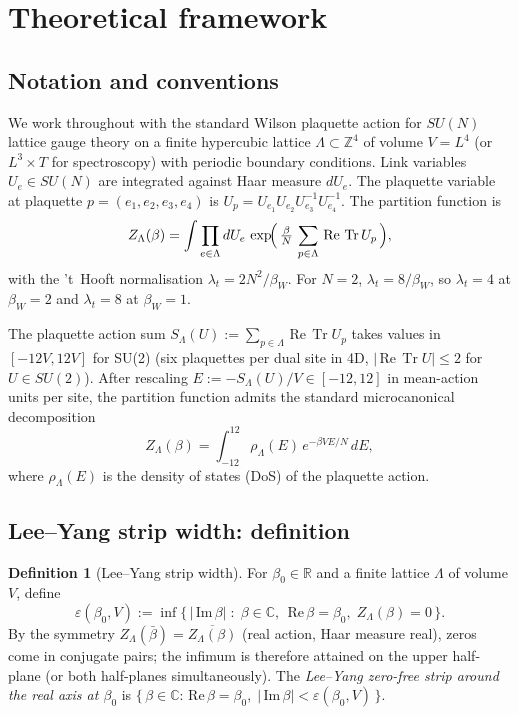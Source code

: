 \documentclass[11pt,a4paper]{article}
\theoremstyle{definition}
\newtheorem{definition}[theorem]{Definition}
\theoremstyle{remark}
\DeclareMathOperator{\Tr}{Tr}
\newcommand{\Z}{\mathbb{Z}}
\newcommand{\R}{\mathbb{R}}
\newcommand{\C}{\mathbb{C}}
\newcommand{\sgnIm}{\,\mathrm{Im}\,}
\newcommand{\sgnRe}{\,\mathrm{Re}\,}
\begin{document}
\medskip

\section{Theoretical framework}\label{sec:framework}

\subsection{Notation and conventions}\label{sec:conv}

We work throughout with the standard Wilson plaquette action for
$SU(N)$ lattice gauge theory on a finite hypercubic lattice
$\Lambda \subset \Z^4$ of volume $V = L^4$ (or $L^3 \times T$ for
spectroscopy) with periodic boundary conditions. Link variables
$U_e \in SU(N)$ are integrated against Haar measure $dU_e$. The
plaquette variable at plaquette $p = (e_1, e_2, e_3, e_4)$ is
$U_p = U_{e_1} U_{e_2} U_{e_3}^{-1} U_{e_4}^{-1}$. The partition
function is
\begin{equation}
Z_\Lambda(\beta) = \int \prod_{e \in \Lambda} dU_e
\,\exp\!\Bigl(\,\tfrac{\beta}{N}\,\sum_{p \in \Lambda}
\sgnRe \Tr U_p\,\Bigr),
\label{eq:Z}
\end{equation}
with the 't~Hooft normalisation $\lambda_t = 2N^2/\beta_W$. For
$N=2$, $\lambda_t = 8/\beta_W$, so $\lambda_t = 4$ at
$\beta_W = 2$ and $\lambda_t = 8$ at $\beta_W = 1$.

The plaquette action sum
$S_\Lambda(U) := \sum_{p \in \Lambda} \sgnRe \Tr U_p$
takes values in $[-12V, 12V]$ for SU(2) (six plaquettes per dual
site in 4D, $|\sgnRe \Tr U| \le 2$ for $U \in SU(2)$).
After rescaling $E := -S_\Lambda(U)/V \in [-12, 12]$ in mean-action
units per site, the partition function admits the standard
microcanonical decomposition
\begin{equation}
Z_\Lambda(\beta) = \int_{-12}^{12} \rho_\Lambda(E)\,
e^{-\beta V E / N}\, dE,
\label{eq:Zdos}
\end{equation}
where $\rho_\Lambda(E)$ is the density of states (DoS) of the
plaquette action.

\subsection{Lee--Yang strip width: definition}

\begin{definition}[Lee--Yang strip width]\label{def:strip}
For $\beta_0 \in \R$ and a finite lattice $\Lambda$ of volume
$V$, define
\begin{equation}
\varepsilon(\beta_0, V)
:= \inf\bigl\{\,|\sgnIm \beta| \;:\; \beta \in \C,\;
\sgnRe \beta = \beta_0,\;
Z_\Lambda(\beta) = 0\,\bigr\}.
\label{eq:stripdef}
\end{equation}
By the symmetry $Z_\Lambda(\bar\beta) = \overline{Z_\Lambda(\beta)}$
(real action, Haar measure real), zeros come in conjugate pairs;
the infimum is therefore attained on the upper half-plane (or both
half-planes simultaneously). The \emph{Lee--Yang zero-free strip
around the real axis at $\beta_0$} is
$\{\,\beta \in \C : \sgnRe \beta = \beta_0,\;
|\sgnIm \beta| < \varepsilon(\beta_0, V)\,\}$.
\end{definition}
\end{document}
